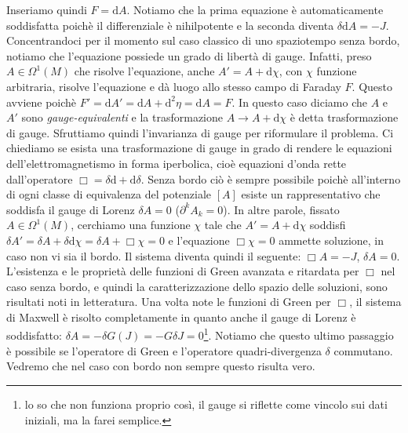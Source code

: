 \documentclass[11pt,a4paper]{article}
\begin{document}
	Inseriamo quindi $F=\mathrm{d}A$. Notiamo che la prima equazione è automaticamente soddisfatta poichè il differenziale è nihilpotente e la seconda diventa $\delta\mathrm{d}A=-J$. Concentrandoci per il momento sul caso classico di uno spaziotempo senza bordo, notiamo che l'equazione possiede un grado di libertà di gauge. Infatti, preso $A\in\Omega^1(M)$ che risolve l'equazione, anche $A'=A+\mathrm{d}\chi$, con $\chi$ funzione arbitraria, risolve l'equazione e dà luogo allo stesso campo di Faraday $F$. Questo avviene poichè $F'=\mathrm{d}A'=\mathrm{d}A+\mathrm{d}^2\eta=\mathrm{d}A=F$. In questo caso diciamo che $A$ e $A'$ sono \emph{gauge-equivalenti} e la trasformazione $A\to A+\mathrm{d}\chi$ è detta trasformazione di gauge. Sfruttiamo quindi l'invarianza di gauge per riformulare il problema. Ci chiediamo se esista una trasformazione di gauge in grado di rendere le equazioni dell'elettromagnetismo in forma iperbolica, cioè equazioni d'onda rette dall'operatore $\Box=\delta\mathrm{d}+\mathrm{d}\delta$. Senza bordo ciò è sempre possibile poichè all'interno di ogni classe di equivalenza del potenziale $[A]$  esiste un rappresentativo che soddisfa il gauge di Lorenz $\delta A=0$ ($\partial^k\!A_k=0$). In altre parole, fissato $A\in\Omega^1(M)$, cerchiamo una funzione $\chi$ tale che $A'=A+\mathrm{d}\chi$ soddisfi $\delta A'=\delta A+\delta\mathrm{d}\chi=\delta A+\Box\chi=0$ e l'equazione $\Box\chi=0$ ammette soluzione, in caso non vi sia il bordo. Il sistema diventa quindi il seguente: $\Box A=-J$, $\delta A=0$.\\
	
	L'esistenza e le proprietà delle funzioni di Green avanzata e ritardata per $\Box$ nel caso senza bordo, e quindi la caratterizzazione dello spazio delle soluzioni, sono risultati noti in letteratura. Una volta note le funzioni di Green per $\Box$, il sistema di Maxwell è risolto completamente in quanto anche il gauge di Lorenz è soddisfatto: $\delta A=-\delta G(J)=-G\delta J=0$\footnote{lo so che non funziona proprio così, il gauge si riflette come vincolo sui dati iniziali, ma la farei semplice.}. Notiamo che questo ultimo passaggio è possibile se l'operatore di Green e l'operatore quadri-divergenza $\delta$ commutano. Vedremo che nel caso con bordo non sempre questo risulta vero.\\
	
\end{document}

